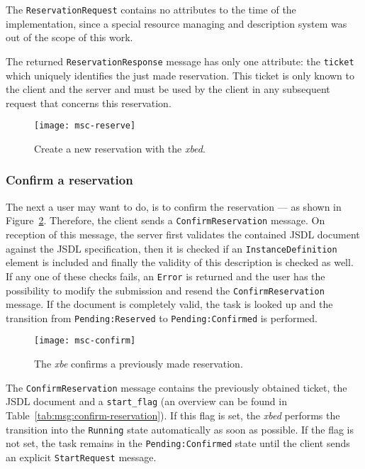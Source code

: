 The \texttt{ReservationRequest} contains no  attributes to the time of the
implementation, since  a special resource managing  and description system
was  out  of  the  scope  of   this  work.

The returned \texttt{ReservationResponse}  message has only one attribute:
the   \texttt{ticket}   which    uniquely   identifies   the   just   made
reservation. This  ticket is only known  to the client and  the server and
must be  used by the client  in any subsequent request  that concerns this
reservation.

\begin{figure}[ht]
  \centering
  \texttt{[image: msc-reserve]}
  \caption[MSC Create  Reservation]{Create   a  new  reservation  with  the
    \emph{xbed}.}
  \label{fig:msc-reserve}
\end{figure}


\subsubsection{Confirm a reservation}

The next a user may want to do, is to confirm the reservation --- as shown
in   Figure~\ref{fig:msc-confirm}.    Therefore,   the  client   sends   a
\texttt{ConfirmReservation}  message. On  reception of  this  message, the
server  first  validates the  contained  JSDL  document  against the  JSDL
specification,  then  it  is  checked  if  an  \texttt{InstanceDefinition}
element  is included  and  finally  the validity  of  this description  is
checked as well.   If any one of these checks  fails, an \texttt{Error} is
returned and  the user  has the possibility  to modify the  submission and
resend  the  \texttt{ConfirmReservation}  message.   If  the  document  is
completely  valid,  the  task  is   looked  up  and  the  transition  from
\texttt{Pending:Reserved} to \texttt{Pending:Confirmed} is performed.

\begin{figure}[ht]
  \centering
  \texttt{[image: msc-confirm]}
  \caption[MSC Confirm  Reservation]{The \emph{xbe} confirms  a previously
    made reservation.}
  \label{fig:msc-confirm}
\end{figure}

The \texttt{ConfirmReservation}  message contains the  previously obtained
ticket, the JSDL  document and a \texttt{start\_flag} (an  overview can be
found  in Table~\ref{tab:msg:confirm-reservation}). If  this flag  is set,
the \emph{xbed}  performs the  transition into the  \texttt{Running} state
automatically  as soon  as possible.   If the  flag is  not set,  the task
remains in the \texttt{Pending:Confirmed}  state until the client sends an
explicit \texttt{StartRequest} message.

